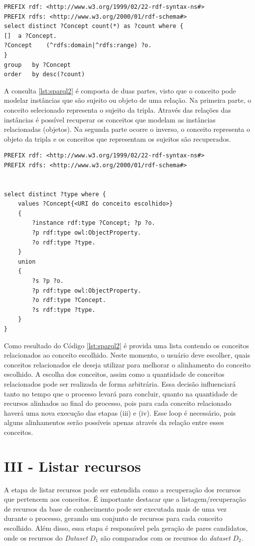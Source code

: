 \begin{lstlisting}[captionpos=b, caption= Consulta SPARQL para identificação de conceito, label=lst:sparql,
basicstyle=\ttfamily,frame=single]
PREFIX rdf: <http://www.w3.org/1999/02/22-rdf-syntax-ns#>
PREFIX rdfs: <http://www.w3.org/2000/01/rdf-schema#>
select distinct ?Concept count(*) as ?count where {
[] 	a ?Concept.
?Concept 	(^rdfs:domain|^rdfs:range) ?o.
}
group 	by ?Concept	
order 	by desc(?count)
\end{lstlisting}

A consulta \ref{lst:sparql2} é composta de duas partes, visto que o conceito pode modelar instâncias que são sujeito ou objeto de uma relação. Na primeira parte, o conceito selecionado representa o sujeito da tripla. Através das relações das instâncias é possível recuperar os conceitos que modelam as instâncias  relacionadas (objetos). Na segunda parte ocorre o inverso, o conceito representa o objeto da tripla e os conceitos que representam os sujeitos são recuperados.

\begin{lstlisting}[captionpos=b, caption=Query SPARQL para recuperação de conceitos relacionados, label=lst:sparql2,
   basicstyle=\ttfamily,frame=single]
PREFIX rdf: <http://www.w3.org/1999/02/22-rdf-syntax-ns#>
PREFIX rdfs: <http://www.w3.org/2000/01/rdf-schema#>


select distinct ?type where {
	values ?Concept{<URI do conceito escolhido>}
	{
		?instance rdf:type ?Concept; ?p ?o.
		?p rdf:type owl:ObjectProperty.
		?o rdf:type ?type.
	}
	union
	{
		?s ?p ?o.
		?p rdf:type owl:ObjectProperty.
		?o rdf:type ?Concept.
		?s rdf:type ?type.
	}
}

\end{lstlisting}

Como resultado do Código \ref{lst:sparql2} é provida uma lista contendo os conceitos relacionados ao conceito escolhido. Neste momento, o usuário deve escolher, quais conceitos relacionados ele deseja utilizar para melhorar o alinhamento do conceito escolhido. A escolha dos conceitos, assim como a quantidade de conceitos relacionados pode ser realizada de forma arbitrária. Essa decisão influenciará tanto no tempo que o processo levará para concluir, quanto na quantidade de recursos alinhados ao final do processo, pois para cada conceito relacionado haverá uma nova execução das etapas (iii) e (iv). Esse loop é necessário, pois alguns alinhamentos serão possíveis apenas através da relação entre esses conceitos.

\section{III - Listar recursos}
A etapa de listar recursos pode ser entendida como a recuperação dos recursos que pertencem aos conceitos. É importante destacar que a listagem/recuperação de recursos da base de conhecimento pode ser executada mais de uma vez durante o processo, gerando um conjunto de recursos para cada conceito escolhido. Além disso, essa etapa é responsável pela geração de pares candidatos, onde os recursos do \textit{Dataset} $D_{1}$ são comparados com os recursos do \textit{dataset} $D_{2}$.


